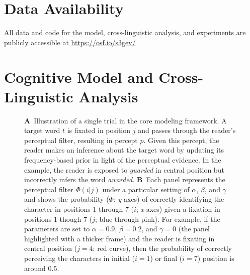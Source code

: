\documentclass[doc,biblatex]{apa7}
\begin{document}
\section{Data Availability}

All data and code for the model, cross-linguistic analysis, and experiments are publicly accessible at \url{https://osf.io/s3gev/}

\section{Cognitive Model and Cross-Linguistic Analysis}

\begin{figure}
\vspace*{2pt}
\caption{\textbf{A}~Illustration of a single trial in the core modeling framework. A target word $t$ is fixated in position $j$ and passes through the reader's perceptual filter, resulting in percept $p$. Given this percept, the reader makes an inference about the target word by updating its frequency-based prior in light of the perceptual evidence. In the example, the reader is exposed to \textit{guarded} in central position but incorrectly infers the word \textit{awarded}. \textbf{B}~Each panel represents the perceptual filter $\Phi(i|j)$ under a particular setting of $\alpha$, $\beta$, and $\gamma$ and shows the probability ($\Phi$; \textit{y}-axes) of correctly identifying the character in positions 1 through 7 ($i$; \textit{x}-axes) given a fixation in positions 1 though 7 ($j$; blue through pink). For example, if the parameters are set to $\alpha=0.9$, $\beta=0.2$, and $\gamma=0$ (the panel highlighted with a thicker frame) and the reader is fixating in central position ($j=4$; red curve), then the probability of correctly perceiving the characters in initial ($i=1$) or final ($i=7$) position is around 0.5.}
\label{fig01}
\end{figure}
\end{document}

